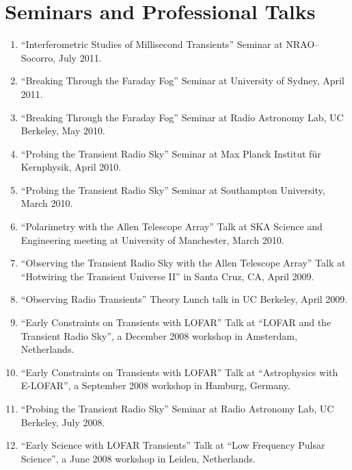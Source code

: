 \documentclass[12pt]{article}
\begin{document}
\section{Seminars and Professional Talks}
\indent

\begin{enumerate}

\item ``Interferometric Studies of Millisecond Transients''  Seminar at NRAO--Socorro, July 2011.

\item ``Breaking Through the Faraday Fog''  Seminar at University of Sydney, April 2011.

\item ``Breaking Through the Faraday Fog''  Seminar at Radio Astronomy Lab, UC Berkeley, May 2010.

\item ``Probing the Transient Radio Sky''  Seminar at Max Planck Institut f\"ur Kernphysik, April 2010.

\item ``Probing the Transient Radio Sky''  Seminar at Southampton University, March 2010.

\item ``Polarimetry with the Allen Telescope Array''  Talk at SKA Science and Engineering meeting at University of Manchester, March 2010.

\item ``Observing the Transient Radio Sky with the Allen Telescope Array''  Talk at ``Hotwiring the Transient Universe II'' in Santa Cruz, CA, April 2009.

\item ``Observing Radio Transients''  Theory Lunch talk in UC Berkeley, April 2009.

\item ``Early Constraints on Transients with LOFAR''  Talk at ``LOFAR and the Transient Radio Sky'', a December 2008 workshop in Amsterdam, Netherlands.

\item ``Early Constraints on Transients with LOFAR''  Talk at ``Astrophysics with E-LOFAR'', a September 2008 workshop in Hamburg, Germany.

\item ``Probing the Transient Radio Sky''  Seminar at Radio Astronomy Lab, UC Berkeley, July 2008.

\item ``Early Science with LOFAR Transients''  Talk at ``Low Frequency Pulsar Science'', a June 2008 workshop in Leiden, Netherlands.


\end{enumerate}
\end{document}
